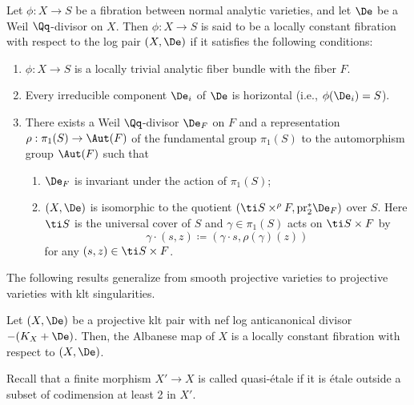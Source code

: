 \documentclass[11pt]{amsart}
\begin{document}
 
\begin{definition}\label{def: locally constant fibration}
Let $\phi: X \to S$ be a fibration between normal analytic varieties, and let $\De$ be a Weil $\Qq$-divisor on $X$. Then $\phi: X \to S$ is said to be a locally constant fibration with respect to the log pair $(X, \De)$ if it satisfies the following conditions:
\begin{enumerate}
    \item $\phi: X \to S$ is a locally trivial analytic fiber bundle with the fiber $F$.
    \item Every irreducible component $\De_i$ of $\De$ is horizontal (i.e., $\phi(\De_i)=S$).
    \item There exists a Weil $\Qq$-divisor $\De_F$ on $F$ and a representation $\rho: \pi_1(S) \to \Aut(F)$ of the fundamental group $\pi_1(S)$ to the automorphism group $\Aut(F)$ such that
    \begin{enumerate}
        \item $\De_F$ is invariant under the action of $\pi_1(S)$;
        \item $(X,\De)$ is isomorphic to the quotient $(\ti S \times^\rho F, {\rm pr}^*_2\De_F)$ over $S$. Here $\ti S$ is the universal cover of $S$ and $\gamma \in \pi_1(S)$ acts on $\ti S \times F$ by
        \[
        \gamma \cdot (s, z) \coloneqq (\gamma \cdot s, \rho(\gamma)(z))
        \] for any $(s,z) \in \ti S \times F$.
    \end{enumerate}
\end{enumerate}
\end{definition}

The following results generalize \cite{Cao19, CH19} from smooth projective varieties to projective varieties with klt singularities.

\begin{theorem}\label{thm: locally constant fibration of Albanese morphism}
Let $(X, \De)$ be a projective klt pair with nef log anticanonical divisor $-(K_X+\De)$. Then, the Albanese map of $X$ is a locally constant fibration with respect to $(X,\De)$.
\end{theorem}

Recall that a finite morphism $X' \to X$ is called quasi-\'etale if it is \'etale outside a subset of codimension at least 2 in $X'$.
\end{document}
